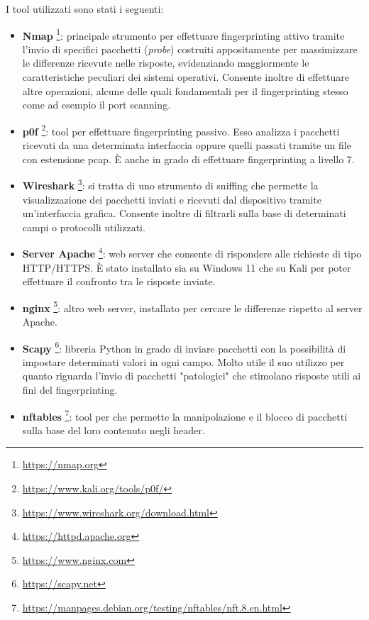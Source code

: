 I tool utilizzati sono stati i seguenti:
\begin{itemize}
	\item \textbf{Nmap} \footnote{\url{https://nmap.org}}: principale strumento per effettuare fingerprinting attivo tramite l'invio di specifici pacchetti (\textit{probe}) costruiti appositamente per massimizzare le differenze ricevute nelle risposte, evidenziando maggiormente le caratteristiche peculiari dei sistemi operativi. Consente inoltre di effettuare altre operazioni, alcune delle quali fondamentali per il fingerprinting stesso come ad esempio il port scanning.
	\item \textbf{p0f} \footnote{\url{https://www.kali.org/tools/p0f/}}: tool per effettuare fingerprinting passivo. Esso analizza i pacchetti ricevuti da una determinata interfaccia oppure quelli passati tramite un file con estensione pcap. È anche in grado di effettuare fingerprinting a livello 7.
	\item \textbf{Wireshark} \footnote{\url{https://www.wireshark.org/download.html}}: si tratta di uno strumento di sniffing che permette la visualizzazione dei pacchetti inviati e ricevuti dal dispositivo tramite un'interfaccia grafica. Consente inoltre di filtrarli sulla base di determinati campi o protocolli utilizzati.
	\item \textbf{Server Apache} \footnote{\url{https://httpd.apache.org}}: web server che consente di rispondere alle richieste di tipo HTTP/HTTPS. È stato installato sia su Windows 11 che su Kali per poter effettuare il confronto tra le risposte inviate.
	\item \textbf{nginx} \footnote{\url{https://www.nginx.com}}: altro web server, installato per cercare le differenze rispetto al server Apache.
	\item \textbf{Scapy} \footnote{\url{https://scapy.net}}: libreria Python in grado di inviare pacchetti con la possibilità di impostare determinati valori in ogni campo. Molto utile il suo utilizzo per quanto riguarda l'invio di pacchetti "patologici" che stimolano risposte utili ai fini del fingerprinting.
	\item \textbf{nftables} \footnote{\url{https://manpages.debian.org/testing/nftables/nft.8.en.html}}: tool per che permette la manipolazione e il blocco di pacchetti sulla base del loro contenuto negli header.
\end{itemize}

	






